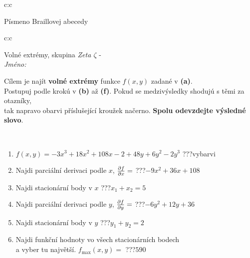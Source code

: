 \documentclass[10pt]{report}
\begin{document}
\begin{tabular}{c:c}
\begin{minipage}[c][104.5mm][t]{0.5\linewidth}
\begin{center}
\begin{minipage}{0.20\linewidth}
\begin{center}
{\small Písmeno Braillovej abecedy}
\end{center}
\end{minipage}
\end{center}
\end{minipage}
%
\end{tabular}
\newpage
\thispagestyle{empty}
\begin{tabular}{c:c}
\begin{minipage}[c][104.5mm][t]{0.5\linewidth}
\begin{center}
\vspace{7mm}
{\huge Volné extrémy, skupina \textit{Zeta $\zeta$} -}\\[5mm]
\textit{Jméno:}\phantom{xxxxxxxxxxxxxxxxxxxxxxxxxxxxxxxxxxxxxxxxxxxxxxxxxxxxxxxxxxxxxxxxx}\\[5mm]
\begin{minipage}{0.95\linewidth}
\begin{center}
Cílem je najít \textbf{volné extrémy} funkce $f(x,y)$ zadané v \textbf{(a)}.\\Postupuj podle krokú v \textbf{(b)} až \textbf{(f)}. Pokud se medzivýsledky shodujú s těmi za otazníky,\\tak napravo obarvi příslušející kroužek načerno. \textbf{Spolu odevzdejte výsledné slovo}.
\end{center}
\end{minipage}
\\[1mm]
\begin{minipage}{0.79\linewidth}
\begin{center}
\begin{varwidth}{\linewidth}
\begin{enumerate}
\normalsize
\item $f(x,y)=-3x^3+18x^2+108x-2+48y+6y^2-2y^3$\quad \dotfill\; ???\;\dotfill \quad vybarvi
\item Najdi parciální derivaci podle $x$, $\pdv{f}{x}=$\quad \dotfill\; ???\;\dotfill \quad $-9x^2+36x+108$
\item Najdi stacionární body v $x$\quad \dotfill\; ???\;\dotfill \quad $x_1+x_2=5$
\item Najdi parciální derivaci podle $y$, $\pdv{f}{y}=$\quad \dotfill\; ???\;\dotfill \quad $-6y^2+12y+36$
\item Najdi stacionární body v $y$\quad \dotfill\; ???\;\dotfill \quad $y_1+y_2=2$
\item Najdi funkční hodnoty vo všech stacionárních bodech \\ \phantom{xxxxxx} a vyber tu najvětší. $f_{\text{max}}(x,y)=$\quad \dotfill\; ???\;\dotfill \quad $590$

\end{enumerate}
\end{varwidth}
\end{center}
\end{minipage}
\end{center}
\end{minipage}
\end{tabular}
\end{document}
